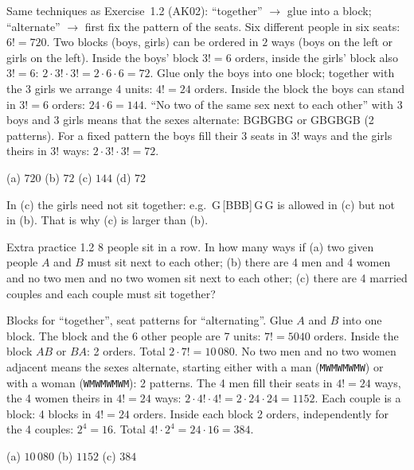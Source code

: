 \ifsolutions
	\soltitle
	\idea Same techniques as Exercise~1.2 (AK02): ``together'' $\to$ glue into
	a block; ``alternate'' $\to$ first fix the pattern of the seats.
	 Six different people in six seats: $6!=720$.
	 Two blocks (boys, girls) can be ordered in $2$ ways (boys on the
	left or girls on the left). Inside the boys' block $3!=6$ orders, inside the
	girls' block also $3!=6$: $2\cdot3!\cdot3!=2\cdot6\cdot6=72$.
	 Glue only the boys into one block; together with the 3 girls we
	arrange 4 units: $4!=24$ orders. Inside the block the boys can stand in
	$3!=6$ orders: $24\cdot6=144$.
	 ``No two of the same sex next to each other'' with 3 boys and 3
	girls means that the sexes alternate: BGBGBG or GBGBGB (2 patterns). For a
	fixed pattern the boys fill their 3 seats in $3!$ ways and the girls theirs
	in $3!$ ways: $2\cdot3!\cdot3!=72$.
	\begin{answer}
		(a) $720$ \quad (b) $72$ \quad (c) $144$ \quad (d) $72$
	\end{answer}
	\begin{remark}
		In (c) the girls need not sit together: e.g.\ G\,[BBB]\,G\,G is allowed
		in (c) but not in (b). That is why (c) is larger than (b).
	\end{remark}
\fi

\begin{task}{Extra practice 1.2}
	8 people sit in a row. In how many ways if (a) two given people $A$ and
	$B$ must sit next to each other; (b) there are 4 men and 4 women and no two
	men and no two women sit next to each other; (c) there are 4 married
	couples and each couple must sit together?
\end{task}
\workspace{2.5cm}

\ifsolutions
	\soltitle
	\idea Blocks for ``together'', seat patterns for ``alternating''.
	 Glue $A$ and $B$ into one block. The block and the 6 other people
	are 7 units: $7!=5040$ orders. Inside the block $AB$ or $BA$: 2 orders.
	Total $2\cdot7!=10\,080$.
	 No two men and no two women adjacent means the sexes alternate,
	starting either with a man (\texttt{MWMWMWMW}) or with a woman
	(\texttt{WMWMWMWM}): 2 patterns. The 4 men fill their seats in $4!=24$
	ways, the 4 women theirs in $4!=24$ ways: $2\cdot4!\cdot4!=2\cdot24\cdot24=1152$.
	 Each couple is a block: 4 blocks in $4!=24$ orders. Inside each
	block 2 orders, independently for the 4 couples: $2^4=16$. Total
	$4!\cdot2^4=24\cdot16=384$.
	\begin{answer}
		(a) $10\,080$ \quad (b) $1152$ \quad (c) $384$
	\end{answer}
\fi

